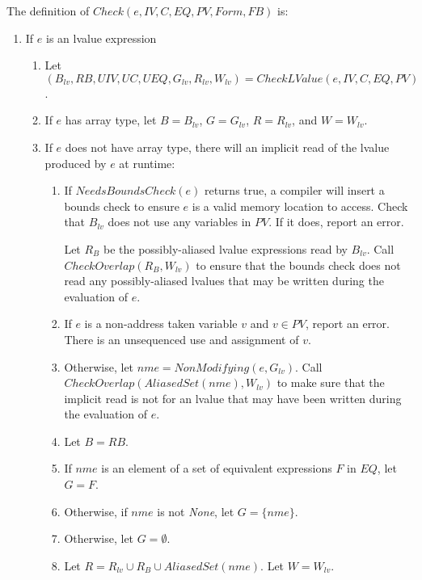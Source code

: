 The definition of $Check(e, IV, C, EQ, PV, Form, FB)$ is:
\begin{enumerate}
\item If $e$ is an lvalue expression
\begin{enumerate}
\item Let $(B_{lv}, RB, \mathit{UIV}, \mathit{UC}, UEQ, G_{lv}, R_{lv}, W_{lv}) = 
         CheckLValue(e, IV, C, EQ, PV)$.
\item If $e$ has array type, let $B = B_{lv}$, $G = G_{lv}$, $R = R_{lv}$, and $W = W_{lv}$.
\item If $e$ does not have array type, there will an implicit read of the lvalue produced by $e$
at runtime:
\begin{enumerate}
\item If $NeedsBoundsCheck(e)$ returns true, a compiler will insert a bounds check 
to ensure $e$ is a valid memory location to access. Check that $B_{lv}$ does not use any variables in
$PV$.  If it does, report an error.

Let $R_B$ be the possibly-aliased lvalue expressions read by $B_{lv}$.   
Call $CheckOverlap(R_B, W_{lv})$ to ensure that the bounds check does not read any possibly-aliased
lvalues that may be written during the evaluation of $e$.
\item If $e$ is a non-address taken variable $v$ and $v \in PV$, report an error.  There is an unsequenced 
use and assignment of $v$.
\item Otherwise, let $nme = NonModifying(e, G_{lv})$.  Call $CheckOverlap(AliasedSet(nme), W_{lv})$ to make  sure that the  implicit read is not for an lvalue that may have been written during the evaluation of $e$. 
\item Let $B = RB$. 
\item If $nme$ is an element of a set of equivalent expressions $F$ in $EQ$, let $G = F$.
\item Otherwise, if $nme$ is not {\it None}, let $G = \{ nme \}$.
\item Otherwise, let $G = \emptyset$.
\item Let $R = R_{lv} \cup R_B \cup AliasedSet(nme)$.  Let $W = W_{lv}$.
\end{enumerate}
\end{enumerate}



\end{enumerate}
